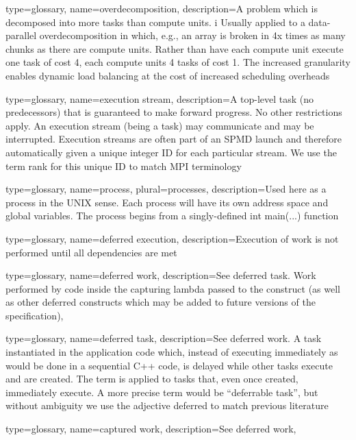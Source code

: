{
  type=glossary,
  name=overdecomposition,
  description={A problem which is decomposed into more tasks than compute units. i
  Usually applied to a data-parallel overdecomposition in which, e.g., an array
  is broken in 4x times as many chunks as there are compute units.
  Rather than have each compute unit execute one task of cost 4,
  each compute units 4 tasks of cost 1.
  The increased granularity enables dynamic load balancing at the cost of increased 
  scheduling overheads}
}

{
  type=glossary,
  name={execution stream},
  description={A top-level task (no predecessors) that is guaranteed to make forward progress.
  No other restrictions apply. An execution stream (being a \gls{task}) may communicate
  and may be interrupted. Execution streams are often part of an SPMD launch and therefore
  automatically given a unique integer ID for each particular stream. We use the term rank
  for this unique ID to match MPI terminology}
}

{
  type=glossary,
  name={process},
  plural={processes},
  description={Used here as a process in the UNIX sense. Each process will have its own address space and global variables.
    The process begins from a singly-defined int main(...) function}
}

{
  type=glossary,
  name={deferred execution},
  description={Execution of work is not performed until all dependencies are
    met}
  }

{
  type=glossary,
  name={deferred work},
  description={See \gls{deferred task}. Work
performed by code inside the capturing lambda passed to the
 construct (as well as other deferred constructs which
may be added to future versions of the specification)},
}

{
  type=glossary,
  name={deferred task},
  description={See \gls{deferred work}. A \gls{task} instantiated in the application code
  which, instead of executing immediately as would be done in a sequential C++ code,
  is delayed while other tasks execute and are created.
  The term is applied to tasks that, even once created, immediately execute.
  A more precise term would be ``deferrable task'', but without ambiguity
  we use the adjective deferred to match previous literature}
}

{
  type=glossary,
  name={captured work},
  description={See \gls{deferred work}},
}

